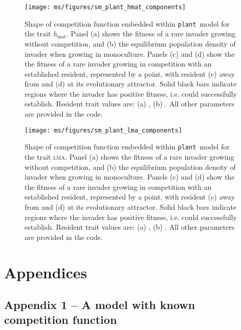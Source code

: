 \documentclass[a4paper,11pt]{article}
\newcommand{\todo}[1]{{\color{navy}{(todo: #1)}}}
\newcommand{\plant}{{\tt plant}}
\newcommand{\hmat}{\ensuremath{h_{\text{mat}}}}
\newcommand{\lma}{\textsc{lma}}
\begin{document}
\clearpage

\begin{figure}[ht]
 \centering
 \texttt{[image: ms/figures/sm\_plant\_hmat\_components]}
 \caption{Shape of competition function embedded within \plant\ model for the trait \hmat. Panel (a) shows  the fitness of a rare invader growing without competition, and (b) the equilibrium population density of invader when growing in monoculture. Panels (c) and (d) show the the fitness of a rare invader growing in competition with an established resident, represented by a point, with resident (c) away from and (d) at its evolutionary attractor. Solid black bars indicate regions where the invader has positive fitness, i.e. could successfully establish. Resident trait values are: (a) \todo{XXX}, (b) \todo{XXX}. All other parameters are provided in the code. }
 \label{fig:plant_hmat}
\end{figure}

\clearpage

\begin{figure}[ht]
  \centering
  \texttt{[image: ms/figures/sm\_plant\_lma\_components]}
  \caption{Shape of competition function embedded within \plant\ model for the trait \lma. Panel (a) shows  the fitness of a rare invader growing without competition, and (b) the equilibrium population density of invader when growing in monoculture. Panels (c) and (d) show the the fitness of a rare invader growing in competition with an established resident, represented by a point, with resident (c) away from and (d) at its evolutionary attractor. Solid black bars indicate regions where the invader has positive fitness, i.e. could successfully establish. Resident trait values are: (a) \todo{XXX}, (b) \todo{XXX}. All other parameters are provided in the code.}
  \label{fig:plant_lma}
\end{figure}

\clearpage




\section{Appendices}

\subsection{Appendix 1 -- A model with known competition function}\label{sec:DD99}
\end{document}
